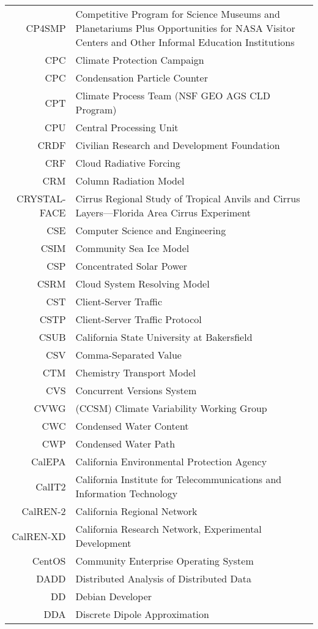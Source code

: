 \documentclass[12pt,twoside]{article}
\begin{document}
\begin{longtable}[>{\bfseries}l]{>{\ttfamily}r l}
CP4SMP & Competitive Program for Science Museums and Planetariums Plus Opportunities for NASA Visitor Centers and Other Informal Education Institutions \\
CPC & Climate Protection Campaign \\
CPC & Condensation Particle Counter \\ 
CPT & Climate Process Team (NSF GEO AGS CLD Program) \\
CPU & Central Processing Unit \\
CRDF & Civilian Research and Development Foundation \\
CRF & Cloud Radiative Forcing \\
CRM & Column Radiation Model \\
CRYSTAL-FACE & Cirrus Regional Study of Tropical Anvils and Cirrus Layers---Florida Area Cirrus Experiment \\
CSE & Computer Science and Engineering \\
CSIM & Community Sea Ice Model \\
CSP & Concentrated Solar Power \\
CSRM & Cloud System Resolving Model \\
CST & Client-Server Traffic \\
CSTP & Client-Server Traffic Protocol \\
CSUB & California State University at Bakersfield \\
CSV & Comma-Separated Value \\
CTM & Chemistry Transport Model \\
CVS & Concurrent Versions System \\
CVWG & (CCSM) Climate Variability Working Group \\
CWC & Condensed Water Content \\
CWP & Condensed Water Path \\
CalEPA & California Environmental Protection Agency \\
CalIT2 & California Institute for Telecommunications and Information Technology \\
CalREN-2 & California Regional Network \\
CalREN-XD & California Research Network, Experimental Development \\
CentOS & Community Enterprise Operating System \\
DADD & Distributed Analysis of Distributed Data \\
DD & Debian Developer \\
DDA & Discrete Dipole Approximation \\

\end{longtable}
\end{document}
